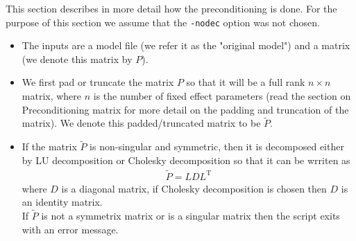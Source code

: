 This section describes in more detail how the preconditioning is done. For the purpose of this section we assume that the \verb;-nodec; option was not chosen.

\begin{itemize}
    \item The inputs are a model file (we refer it as the "original model") and a matrix (we denote this matrix by $P$).
    \item We first pad or truncate the matrix $P$ so that it will be a full rank $n \times n$ matrix, where $n$ is the number of fixed effect parameters (read the section on Preconditioning matrix for more detail on the padding and truncation of the matrix).  We denote this padded/truncated matrix to be $\tilde{P}$.
    \item If the matrix $\tilde{P}$ is non-singular and symmetric, then it is decomposed either by LU decomposition or Cholesky decomposition so that it can be wrriten as 
    \begin{eqnarray*}
    \tilde{P}=LDL^\textrm{T}
    \end{eqnarray*}
    where $D$ is a diagonal matrix, if Cholesky decomposition is chosen then $D$ is an identity matrix.\\
    If $\tilde{P}$ is not a symmetrix matrix or is a singular matrix then the script exits with an error message.


\end{itemize}
